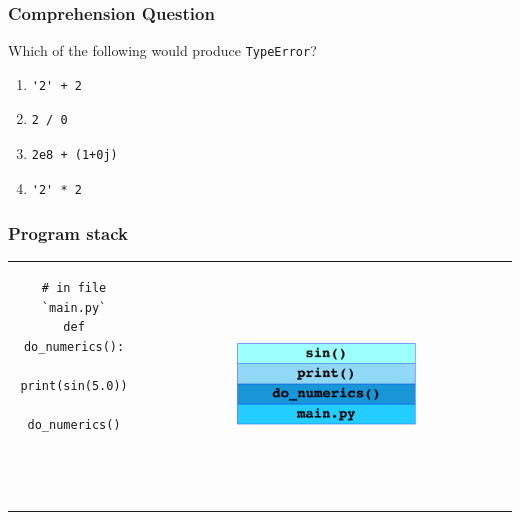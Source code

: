 \documentclass[11pt]{beamer}
\begin{document}
\begin{frame}[fragile]
  \frametitle{Comprehension Question}
  \Enlarge

  Which of the following would produce \texttt{TypeError}?

  \begin{enumerate}[label=\Alph*]
  \item  \begin{verbatim}'2' + 2\end{verbatim}
  \item  \begin{verbatim}2 / 0\end{verbatim}
  \item  \begin{verbatim}2e8 + (1+0j)\end{verbatim}
  \item  \begin{verbatim}'2' * 2\end{verbatim}
  \end{enumerate}
\end{frame}

\begin{frame}[fragile]
  \frametitle{Program stack}

  \begin{tabular}{cc}
    \begin{minipage}{2in}
    \begin{verbatim}
# in file `main.py`
def do_numerics():
    print(sin(5.0))

do_numerics()




    \end{verbatim}
    \end{minipage}
    &
    \includegraphics[width=0.5\textwidth]{./img/stack.png}
    \\
  \end{tabular}
\end{frame}

\end{document}
